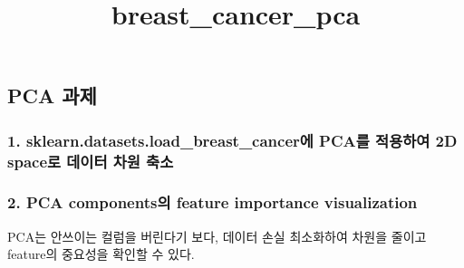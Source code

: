 \documentclass[11pt]{article}
\title{breast\_cancer\_pca}
\begin{document}
    
    \maketitle
    
    

    
    \hypertarget{pca-uxacfcuxc81c}{%
\subsection{PCA 과제}\label{pca-uxacfcuxc81c}}

\hypertarget{sklearn.datasets.load_breast_canceruxc5d0-pcauxb97c-uxc801uxc6a9uxd558uxc5ec-2d-spaceuxb85c-uxb370uxc774uxd130-uxcc28uxc6d0-uxcd95uxc18c}{%
\subsubsection{1. sklearn.datasets.load\_breast\_cancer에 PCA를 적용하여
2D space로 데이터 차원
축소}\label{sklearn.datasets.load_breast_canceruxc5d0-pcauxb97c-uxc801uxc6a9uxd558uxc5ec-2d-spaceuxb85c-uxb370uxc774uxd130-uxcc28uxc6d0-uxcd95uxc18c}}

\hypertarget{pca-componentsuxc758-feature-importance-visualization}{%
\subsubsection{2. PCA components의 feature importance
visualization}\label{pca-componentsuxc758-feature-importance-visualization}}

PCA는 안쓰이는 컬럼을 버린다기 보다, 데이터 손실 최소화하여 차원을
줄이고 feature의 중요성을 확인할 수 있다.
\end{document}
